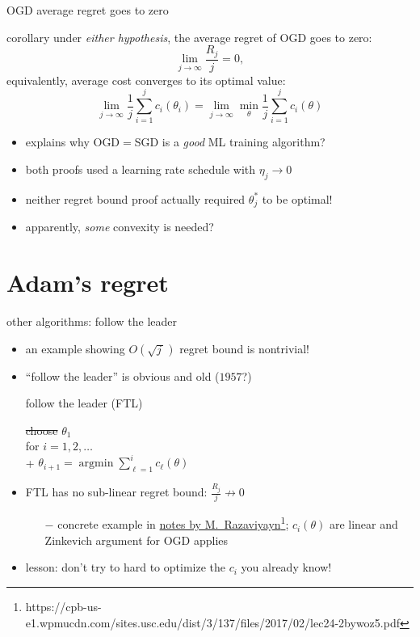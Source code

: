 \documentclass[xcolor={svgnames},
               hyperref={colorlinks,citecolor=DeepPink4,linkcolor=FireBrick,urlcolor=Maroon},
               usepdftitle=false]  %
               {beamer}
\newcommand{\argmin}{\operatorname{argmin}}
\newcommand{\ds}{\displaystyle}
\begin{document}
\begin{frame}{OGD average regret goes to zero}

\begin{block}{corollary}
under \emph{either hypothesis}, the average regret of OGD goes to zero:
    $$\lim_{j\to\infty} \frac{R_j}{j} = 0,$$
equivalently, average cost converges to its optimal value:
    $$\lim_{j\to\infty} \frac{1}{j} \sum_{i=1}^j c_i(\theta_i) = \lim_{j\to\infty} \min_\theta \frac{1}{j} \sum_{i=1}^j c_i(\theta)$$
\end{block}

\begin{itemize}
\item explains why OGD$=$SGD is a \emph{good} ML training algorithm?
\item both proofs used a learning rate schedule with $\eta_j \to 0$
\item neither regret bound proof actually required $\theta_j^*$ to be optimal!
\item apparently, \emph{some} convexity is needed?
\end{itemize}
\end{frame}


\section{Adam's regret}

\begin{frame}{other algorithms: follow the leader}

\begin{itemize}
\item an example showing $O(\sqrt{j\,})$ regret bound is nontrivial!
\item ``follow the leader'' is obvious and old ($1957$?)

\begin{block}{follow the leader (FTL)}

\begin{pseudo*}
\st{choose} $\theta_1$ \\
for $i = 1,2,\dots$ \\+
    $\ds \theta_{i+1} = \argmin \sum_{\ell=1}^i c_\ell(\theta)$
\end{pseudo*}
\end{block}

\item FTL has no sub-linear regret bound: $\ds \frac{R_j}{j} \nrightarrow 0$
    \begin{itemize}
    \item[$-$] concrete example in \href{https://cpb-us-e1.wpmucdn.com/sites.usc.edu/dist/3/137/files/2017/02/lec24-2bywoz5.pdf}{notes by M.~Razaviyayn}\footnote{https://cpb-us-e1.wpmucdn.com/sites.usc.edu/dist/3/137/files/2017/02/lec24-2bywoz5.pdf}; $c_i(\theta)$ are linear and Zinkevich argument for OGD applies
    \end{itemize}
\item lesson: don't try to hard to optimize the $c_i$ you already know!
\end{itemize}
\end{frame}
\end{document}
